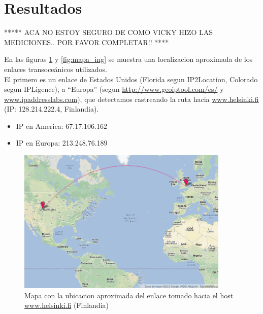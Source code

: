 \section{Resultados}



***** ACA NO ESTOY SEGURO DE COMO VICKY HIZO LAS MEDICIONES.. POR FAVOR COMPLETAR!! ****

En las figuras \ref{fig:mapa_fin} y \ref{fig:mapa_ing} se muestra una localizacion aproximada de los enlaces transoceánicos utilizados.\\

El primero es un enlace de Estados Unidos (Florida segun IP2Location, Colorado segun IPLigence), a ``Europa'' (segun \url{http://www.geoiptool.com/es/} y \url{www.ipaddresslabs.com}), que detectamos rastreando la ruta hacia \url{www.helsinki.fi} (IP: 128.214.222.4, Finlandia). \\

\begin{itemize}
 \item IP en America: 67.17.106.162
 \item IP en Europa: 213.248.76.189\\
\end{itemize}

\begin{figure}[H]
  \centering
    \includegraphics[width=0.9\textwidth]{imgs/finlandia_enlace_1.png}
    \caption{Mapa con la ubicacion aproximada del enlace tomado hacia el host \url{www.helsinki.fi} (Finlandia)}
    \label{fig:mapa_fin}
\end{figure}    


